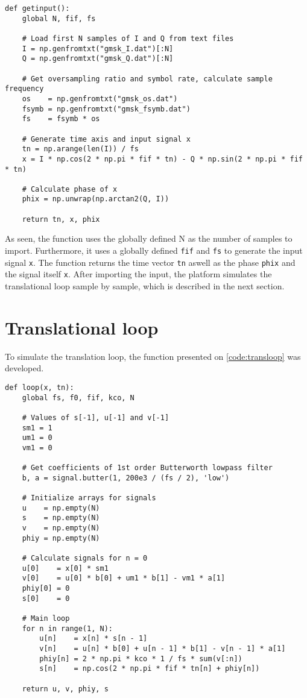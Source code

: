 \lstset{language=python,caption=Function for importing input data,label=code:input}
\begin{lstlisting}
def getinput():
    global N, fif, fs

    # Load first N samples of I and Q from text files
    I = np.genfromtxt("gmsk_I.dat")[:N]
    Q = np.genfromtxt("gmsk_Q.dat")[:N]

    # Get oversampling ratio and symbol rate, calculate sample frequency
    os    = np.genfromtxt("gmsk_os.dat")
    fsymb = np.genfromtxt("gmsk_fsymb.dat")
    fs    = fsymb * os

    # Generate time axis and input signal x
    tn = np.arange(len(I)) / fs
    x = I * np.cos(2 * np.pi * fif * tn) - Q * np.sin(2 * np.pi * fif * tn)

    # Calculate phase of x
    phix = np.unwrap(np.arctan2(Q, I))

    return tn, x, phix
\end{lstlisting}
As seen, the function uses the globally defined N as the number of samples to import. Furthermore, it uses a globally defined \texttt{fif} and \texttt{fs} to generate the input signal \texttt{x}. The function returns the time vector \texttt{tn} aswell as the phase \texttt{phix} and the signal itself \texttt{x}. After importing the input, the platform simulates the translational loop sample by sample, which is described in the next section.


\section{Translational loop}
To simulate the translation loop, the function presented on \cref{code:transloop} was developed.\\

\lstset{language=python,caption=Function for simulating tranlational loop,label=code:transloop}
\begin{lstlisting}
def loop(x, tn):
    global fs, f0, fif, kco, N

    # Values of s[-1], u[-1] and v[-1]
    sm1 = 1
    um1 = 0
    vm1 = 0

    # Get coefficients of 1st order Butterworth lowpass filter
    b, a = signal.butter(1, 200e3 / (fs / 2), 'low')

    # Initialize arrays for signals
    u    = np.empty(N)
    s    = np.empty(N)
    v    = np.empty(N)
    phiy = np.empty(N)

    # Calculate signals for n = 0
    u[0]    = x[0] * sm1
    v[0]    = u[0] * b[0] + um1 * b[1] - vm1 * a[1]
    phiy[0] = 0
    s[0]    = 0

    # Main loop
    for n in range(1, N):
        u[n]    = x[n] * s[n - 1]
        v[n]    = u[n] * b[0] + u[n - 1] * b[1] - v[n - 1] * a[1]
        phiy[n] = 2 * np.pi * kco * 1 / fs * sum(v[:n])
        s[n]    = np.cos(2 * np.pi * fif * tn[n] + phiy[n])

    return u, v, phiy, s
\end{lstlisting}

